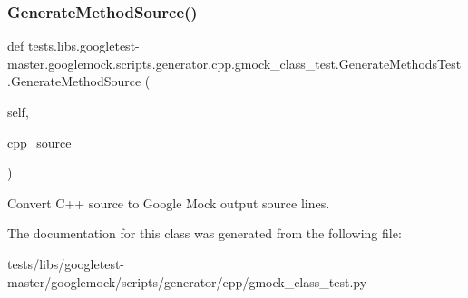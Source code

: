 \subsubsection{\texorpdfstring{Generate\+Method\+Source()}{GenerateMethodSource()}}
{\footnotesize\ttfamily def tests.\+libs.\+googletest-\/master.\+googlemock.\+scripts.\+generator.\+cpp.\+gmock\+\_\+class\+\_\+test.\+Generate\+Methods\+Test.\+Generate\+Method\+Source (\begin{DoxyParamCaption}\item[{}]{self,  }\item[{}]{cpp\+\_\+source }\end{DoxyParamCaption})}

\begin{DoxyVerb}Convert C++ source to Google Mock output source lines.\end{DoxyVerb}
 

The documentation for this class was generated from the following file\+:\begin{DoxyCompactItemize}
\item 
tests/libs/googletest-\/master/googlemock/scripts/generator/cpp/gmock\+\_\+class\+\_\+test.\+py\end{DoxyCompactItemize}

